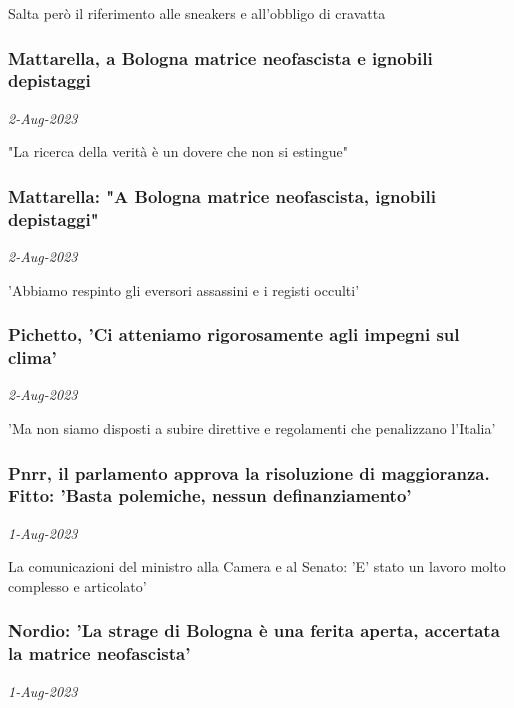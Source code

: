 Salta per\`{o} il riferimento alle sneakers e all'obbligo di cravatta
\subsubsection{Mattarella, a Bologna matrice neofascista e ignobili depistaggi \href{https://www.ansa.it/sito/notizie/politica/2023/08/02/mattarella-a-bologna-matrice-neofascista-e-ignobili-depistaggi_d1b410a7-99d6-488b-a8ea-78c0ceef035d.html}{}}
\textit{2-Aug-2023}

"La ricerca della verit\`{a} \`{e} un dovere che non si estingue"
\subsubsection{Mattarella: "A Bologna matrice neofascista, ignobili depistaggi" \href{https://www.ansa.it/sito/notizie/politica/2023/08/02/mattarella-a-bologna-matrice-neofascista-ignobili-depistaggi_c2a33536-c4f3-44aa-9491-85b237b5d655.html}{}}
\textit{2-Aug-2023}

'Abbiamo respinto gli eversori assassini e i registi occulti'
\subsubsection{Pichetto, 'Ci atteniamo rigorosamente agli impegni sul clima' \href{https://www.ansa.it/sito/notizie/politica/2023/08/02/pichetto-ci-atteniamo-rigorosamente-agli-impegni-sul-clima-_cdfa516d-3ec5-42ab-852f-9b2faf1ff24e.html}{}}
\textit{2-Aug-2023}

'Ma non siamo disposti a subire direttive e regolamenti che penalizzano l'Italia'
\subsubsection{Pnrr, il parlamento approva la risoluzione di maggioranza. Fitto: 'Basta polemiche, nessun definanziamento' \href{https://www.ansa.it/sito/notizie/politica/2023/08/01/pnrr-il-parlamento-approva-la-risoluzione-di-maggioranza.-fitto-basta-polemiche-nessun-definanziamento_167db132-c02e-46c7-b386-30a49ee2221c.html}{}}
\textit{1-Aug-2023}

La comunicazioni del ministro alla Camera e al Senato: 'E' stato un lavoro molto complesso e articolato'
\subsubsection{Nordio: 'La strage di Bologna \`{e} una ferita aperta, accertata la matrice neofascista' \href{https://www.ansa.it/sito/notizie/politica/2023/08/01/nordio-la-strage-di-bologna-e-una-ferita-aperta-accertata-la-matrice-neofascista_17dddb51-a020-48ca-93d4-b489d6fc4c29.html}{}}
\textit{1-Aug-2023}

